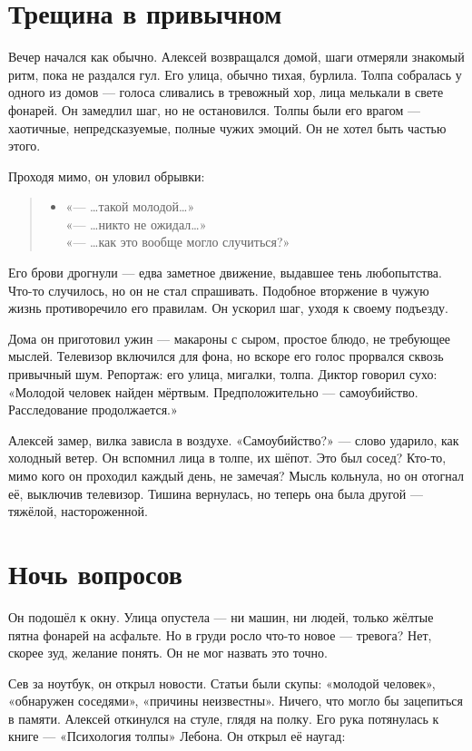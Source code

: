 \documentclass[12pt,a4paper]{book}
\newenvironment{dialogue}{\begin{quote}\itshape\begin{itemize}\item[]}{\end{itemize}\end{quote}}
\begin{document}
\section{Трещина в привычном}

Вечер начался как обычно. Алексей возвращался домой, шаги отмеряли знакомый ритм, пока не раздался гул. Его улица, обычно тихая, бурлила. Толпа собралась у одного из домов --- голоса сливались в тревожный хор, лица мелькали в свете фонарей. Он замедлил шаг, но не остановился. Толпы были его врагом --- хаотичные, непредсказуемые, полные чужих эмоций. Он не хотел быть частью этого.

Проходя мимо, он уловил обрывки:

\begin{dialogue}
«--- \ldots такой молодой\ldots»\\[0.5em]
«--- \ldots никто не ожидал\ldots»\\[0.5em]
«--- \ldots как это вообще могло случиться?»
\end{dialogue}

Его брови дрогнули --- едва заметное движение, выдавшее тень любопытства. Что-то случилось, но он не стал спрашивать. Подобное вторжение в чужую жизнь противоречило его правилам. Он ускорил шаг, уходя к своему подъезду.

Дома он приготовил ужин --- макароны с сыром, простое блюдо, не требующее мыслей. Телевизор включился для фона, но вскоре его голос прорвался сквозь привычный шум. Репортаж: его улица, мигалки, толпа. Диктор говорил сухо: «Молодой человек найден мёртвым. Предположительно --- самоубийство. Расследование продолжается.»

Алексей замер, вилка зависла в воздухе. «Самоубийство?» --- слово ударило, как холодный ветер. Он вспомнил лица в толпе, их шёпот. Это был сосед? Кто-то, мимо кого он проходил каждый день, не замечая? Мысль кольнула, но он отогнал её, выключив телевизор. Тишина вернулась, но теперь она была другой --- тяжёлой, настороженной.

\section{Ночь вопросов}

Он подошёл к окну. Улица опустела --- ни машин, ни людей, только жёлтые пятна фонарей на асфальте. Но в груди росло что-то новое --- тревога? Нет, скорее зуд, желание понять. Он не мог назвать это точно.

Сев за ноутбук, он открыл новости. Статьи были скупы: «молодой человек», «обнаружен соседями», «причины неизвестны». Ничего, что могло бы зацепиться в памяти. Алексей откинулся на стуле, глядя на полку. Его рука потянулась к книге --- «Психология толпы» Лебона. Он открыл её наугад:
\end{document}
